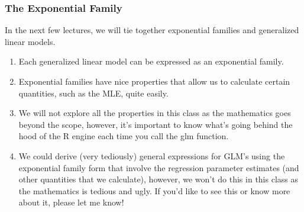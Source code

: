 \documentclass{beamer}
\begin{document}
%
%


\begin{frame}
\frametitle{The Exponential Family}

In the next few lectures, we will tie together exponential families and generalized linear models. 

\begin{enumerate}
\item Each generalized linear model can be expressed as an exponential family. 
\item Exponential families have nice properties that allow us to calculate certain quantities, such as the MLE, quite easily. 
\item We will not explore all the properties in this class as the mathematics goes beyond the scope, however, it's important to know what's going behind the hood of the R engine each time you call the glm function. 
\item We could derive (very tediously) general expressions for GLM's using the exponential family form that involve the regression parameter estimates (and other quantities that we calculate), however, we won't do this in this class as the mathematics is tedious and ugly. If you'd like to see this or know more about it, please let me know! 
\end{enumerate}



\end{frame}
\end{document}

